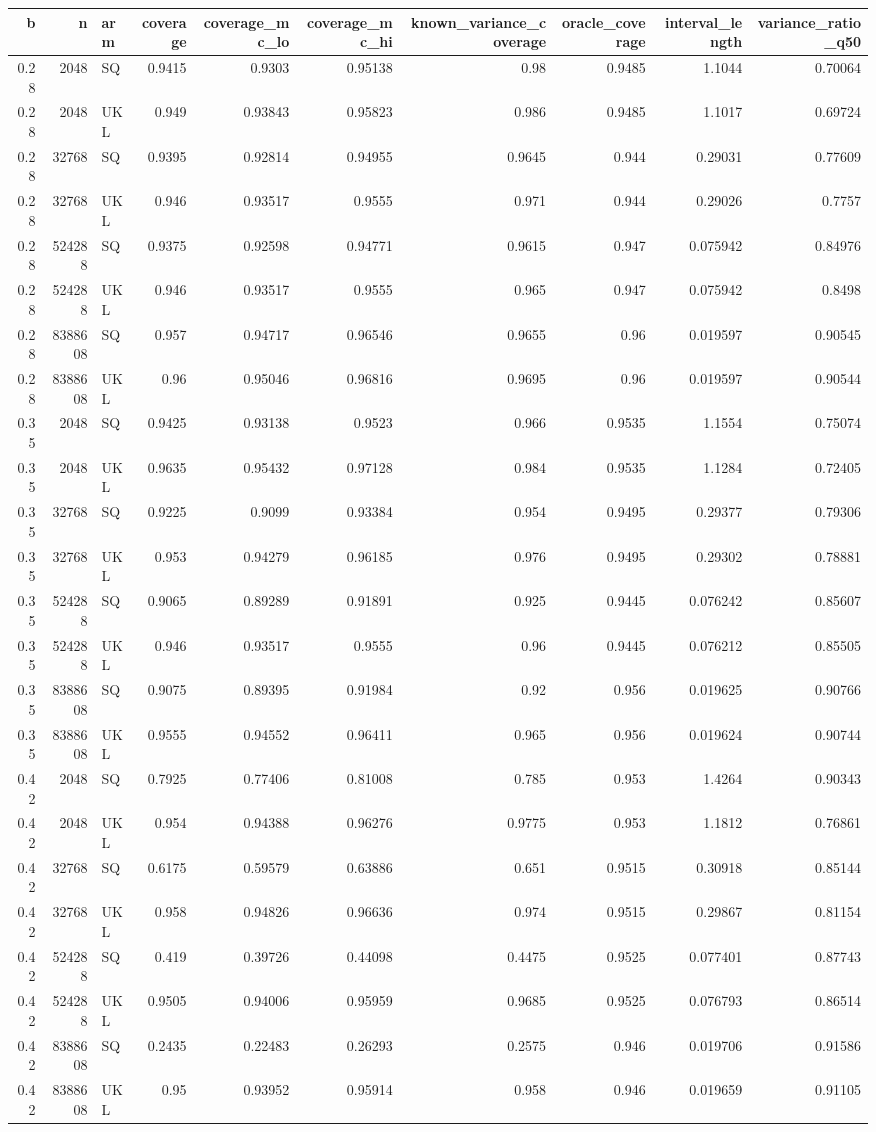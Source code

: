 \begin{tabular}{rrlrrrrrrr}
\toprule
b & n & arm & coverage & coverage_mc_lo & coverage_mc_hi & known_variance_coverage & oracle_coverage & interval_length & variance_ratio_q50 \\
\midrule
0.28 & 2048 & SQ & 0.9415 & 0.9303 & 0.95138 & 0.98 & 0.9485 & 1.1044 & 0.70064 \\
0.28 & 2048 & UKL & 0.949 & 0.93843 & 0.95823 & 0.986 & 0.9485 & 1.1017 & 0.69724 \\
0.28 & 32768 & SQ & 0.9395 & 0.92814 & 0.94955 & 0.9645 & 0.944 & 0.29031 & 0.77609 \\
0.28 & 32768 & UKL & 0.946 & 0.93517 & 0.9555 & 0.971 & 0.944 & 0.29026 & 0.7757 \\
0.28 & 524288 & SQ & 0.9375 & 0.92598 & 0.94771 & 0.9615 & 0.947 & 0.075942 & 0.84976 \\
0.28 & 524288 & UKL & 0.946 & 0.93517 & 0.9555 & 0.965 & 0.947 & 0.075942 & 0.8498 \\
0.28 & 8388608 & SQ & 0.957 & 0.94717 & 0.96546 & 0.9655 & 0.96 & 0.019597 & 0.90545 \\
0.28 & 8388608 & UKL & 0.96 & 0.95046 & 0.96816 & 0.9695 & 0.96 & 0.019597 & 0.90544 \\
0.35 & 2048 & SQ & 0.9425 & 0.93138 & 0.9523 & 0.966 & 0.9535 & 1.1554 & 0.75074 \\
0.35 & 2048 & UKL & 0.9635 & 0.95432 & 0.97128 & 0.984 & 0.9535 & 1.1284 & 0.72405 \\
0.35 & 32768 & SQ & 0.9225 & 0.9099 & 0.93384 & 0.954 & 0.9495 & 0.29377 & 0.79306 \\
0.35 & 32768 & UKL & 0.953 & 0.94279 & 0.96185 & 0.976 & 0.9495 & 0.29302 & 0.78881 \\
0.35 & 524288 & SQ & 0.9065 & 0.89289 & 0.91891 & 0.925 & 0.9445 & 0.076242 & 0.85607 \\
0.35 & 524288 & UKL & 0.946 & 0.93517 & 0.9555 & 0.96 & 0.9445 & 0.076212 & 0.85505 \\
0.35 & 8388608 & SQ & 0.9075 & 0.89395 & 0.91984 & 0.92 & 0.956 & 0.019625 & 0.90766 \\
0.35 & 8388608 & UKL & 0.9555 & 0.94552 & 0.96411 & 0.965 & 0.956 & 0.019624 & 0.90744 \\
0.42 & 2048 & SQ & 0.7925 & 0.77406 & 0.81008 & 0.785 & 0.953 & 1.4264 & 0.90343 \\
0.42 & 2048 & UKL & 0.954 & 0.94388 & 0.96276 & 0.9775 & 0.953 & 1.1812 & 0.76861 \\
0.42 & 32768 & SQ & 0.6175 & 0.59579 & 0.63886 & 0.651 & 0.9515 & 0.30918 & 0.85144 \\
0.42 & 32768 & UKL & 0.958 & 0.94826 & 0.96636 & 0.974 & 0.9515 & 0.29867 & 0.81154 \\
0.42 & 524288 & SQ & 0.419 & 0.39726 & 0.44098 & 0.4475 & 0.9525 & 0.077401 & 0.87743 \\
0.42 & 524288 & UKL & 0.9505 & 0.94006 & 0.95959 & 0.9685 & 0.9525 & 0.076793 & 0.86514 \\
0.42 & 8388608 & SQ & 0.2435 & 0.22483 & 0.26293 & 0.2575 & 0.946 & 0.019706 & 0.91586 \\
0.42 & 8388608 & UKL & 0.95 & 0.93952 & 0.95914 & 0.958 & 0.946 & 0.019659 & 0.91105 \\
\bottomrule
\end{tabular}
